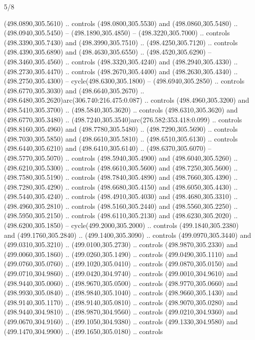 \begin{flagdescription}{5/8}
\begin{scope}[xshift=0.5\flaglength,yshift=0.5\flagwidth,scale=\flagwidth/475.63]
\begin{scope}[y=0.8pt, x=0.8pt, yscale=-1, xscale=1,shift={(-450,-300)}]
\begin{scope}[cm={{1.0,0.0,0.0,1.0,(-0.0002,0.12556)}},cm={{1.0,0.0,0.0,1.0,(0.00179,0.0)}}]
\begin{scope}[cm={{1.11592,0.0,0.0,1.11592,(-106.89933,-41.77764)}}]
\begin{scope}[draw=black,fill=cfff]
\begin{scope}[fill=black]
  (498.0890,305.5610) .. controls (498.0800,305.5530) and (498.0860,305.5480) ..
  (498.0940,305.5450) -- (498.1890,305.4850) -- (498.3220,305.7000) .. controls
  (498.3390,305.7430) and (498.3990,305.7510) .. (498.4250,305.7120) .. controls
  (498.4390,305.6890) and (498.4630,305.6550) .. (498.4520,305.6290) --
  (498.3460,305.4560) .. controls (498.3320,305.4240) and (498.2940,305.4330) ..
  (498.2730,305.4470) .. controls (498.2670,305.4400) and (498.2630,305.4340) ..
  (498.2750,305.4300) -- cycle(498.6300,305.1800) -- (498.6940,305.2850) ..
  controls (498.6770,305.3030) and (498.6640,305.2670) ..
  (498.6480,305.2620)arc(306.740:216.475:0.087) .. controls (498.4960,305.3200)
  and (498.5410,305.3700) .. (498.5840,305.3620) .. controls (498.6310,305.3620)
  and (498.6770,305.3480) .. (498.7240,305.3540)arc(276.582:353.418:0.099) ..
  controls (498.8160,305.4960) and (498.7780,305.5480) .. (498.7290,305.5690) ..
  controls (498.7030,305.5850) and (498.6610,305.5810) .. (498.6510,305.6130) ..
  controls (498.6440,305.6210) and (498.6410,305.6140) .. (498.6370,305.6070) --
  (498.5770,305.5070) .. controls (498.5940,305.4900) and (498.6040,305.5260) ..
  (498.6210,305.5300) .. controls (498.6610,305.5600) and (498.7250,305.5600) ..
  (498.7580,305.5190) .. controls (498.7840,305.4890) and (498.7660,305.4390) ..
  (498.7280,305.4290) .. controls (498.6680,305.4150) and (498.6050,305.4430) ..
  (498.5440,305.4240) .. controls (498.4910,305.4030) and (498.4680,305.3310) ..
  (498.4960,305.2810) .. controls (498.5160,305.2440) and (498.5560,305.2250) ..
  (498.5950,305.2150) .. controls (498.6110,305.2130) and (498.6230,305.2020) ..
  (498.6200,305.1850) -- cycle(499.2000,305.2000) .. controls
  (499.1840,305.2380) and (499.1760,305.2840) .. (499.1400,305.3090) .. controls
  (499.0970,305.3440) and (499.0310,305.3210) .. (499.0100,305.2730) .. controls
  (498.9870,305.2330) and (499.0060,305.1860) .. (499.0260,305.1490) .. controls
  (499.0490,305.1110) and (499.0760,305.0760) .. (499.1020,305.0410) .. controls
  (499.0870,305.0150) and (499.0710,304.9860) .. (499.0420,304.9740) .. controls
  (499.0010,304.9610) and (498.9440,305.0060) .. (498.9670,305.0500) .. controls
  (498.9770,305.0660) and (498.9930,305.0840) .. (498.9840,305.1040) .. controls
  (498.9660,305.1430) and (498.9140,305.1170) .. (498.9140,305.0810) .. controls
  (498.9070,305.0280) and (498.9440,304.9810) .. (498.9870,304.9560) .. controls
  (499.0210,304.9360) and (499.0670,304.9160) .. (499.1050,304.9380) .. controls
  (499.1330,304.9580) and (499.1470,304.9900) .. (499.1650,305.0180) .. controls

\end{scope}
\end{scope}
\end{scope}
\end{scope}
\end{scope}
\end{scope}
\end{flagdescription}
